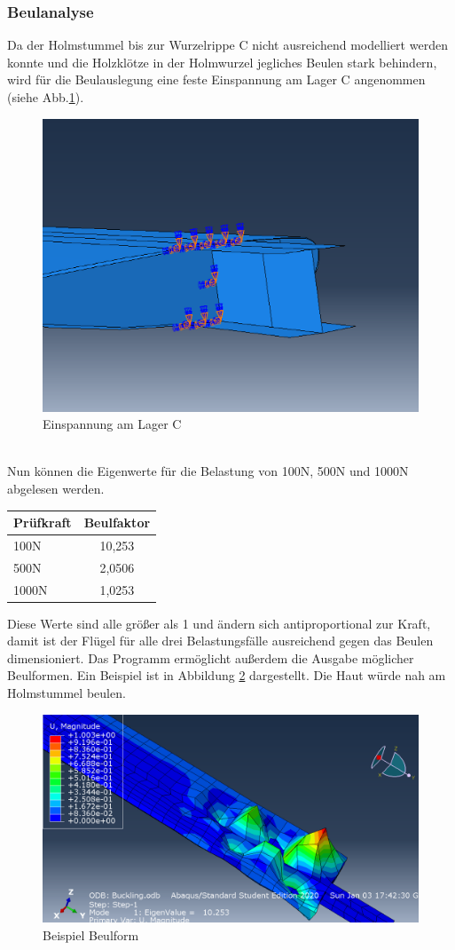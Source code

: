 \subsubsection{Beulanalyse}
Da der Holmstummel bis zur Wurzelrippe C nicht ausreichend modelliert werden konnte und die Holzklötze in der Holmwurzel jegliches Beulen stark behindern, wird für die Beulauslegung eine feste Einspannung am Lager C angenommen (siehe Abb.\ref{BEinspannung}).
\begin{figure}[h]
 \centering
 \includegraphics[scale=0.4]{Bilder/Beuleinspannung}
 \caption{Einspannung am Lager C}
 \label{BEinspannung}
\end{figure}\\
\noindent
Nun können die Eigenwerte für die Belastung von 100N, 500N und 1000N abgelesen werden.
\begin{center}
\begin{tabular}[h]{l|c}
Prüfkraft&Beulfaktor\\
\hline
100N&10,253\\
500N&2,0506\\
1000N&1,0253\\
\end{tabular}
\end{center}
\noindent
Diese Werte sind alle größer als 1 und ändern sich antiproportional zur Kraft, damit ist der Flügel für alle drei Belastungsfälle ausreichend gegen das Beulen dimensioniert.
Das Programm ermöglicht außerdem die Ausgabe möglicher Beulformen. Ein Beispiel ist in Abbildung \ref{Beulform} dargestellt. Die Haut würde nah am Holmstummel beulen. 
\begin{figure}[h]
 \centering
 \includegraphics[scale=0.4]{Bilder/Beulen100N}
 \caption{Beispiel Beulform}
 \label{Beulform}
\end{figure}
\newpage
\newpage

 

  
